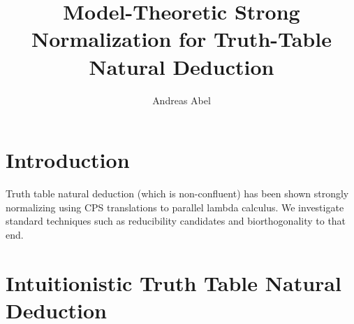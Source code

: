 \documentclass[a4paper,USenglish,cleveref, autoref, thm-restate]{lipics-v2019}
\title{Model-Theoretic Strong Normalization for Truth-Table Natural Deduction}
\author{Andreas Abel
  }{Department of Computer Science,
    Gothenburg University,
    Sweden
  }{andreas.abel@gu.se
  }{https://orcid.org/0000-0003-0420-4492
  }{(Optional) author-specific funding acknowledgements}
\begin{document}
\maketitle

\begin{abstract}
\end{abstract}

\section{Introduction}
\label{sec:intro}

Truth table natural deduction (which is non-confluent)
has been shown strongly normalizing
using CPS translations to parallel lambda calculus.  We investigate
standard techniques such as reducibility candidates and
biorthogonality to that end.

\section{Intuitionistic Truth Table Natural Deduction}
\label{sec:nd}
\end{document}
